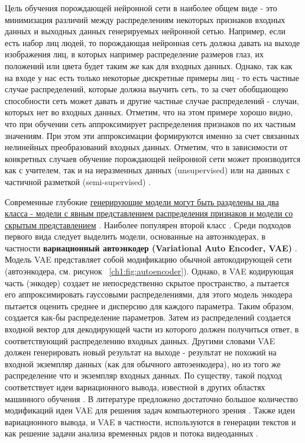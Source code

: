 \documentclass[12pt]{article}
\begin{document}
\begin{sloppypar}
Цель обучения порождающей нейронной сети в наиболее общем виде - это минимизация различий между распределениям некоторых признаков входных данных и выходных данных генерируемых нейронной сетью. Например, если есть набор лиц людей, то порождающая нейронная сеть должна давать на выходе изображения лиц, в которых например распределение размеров глаз, их положений или цвета будет таким же как для входных данных. Однако, так как на входе у нас есть только некоторые дискретные примеры лиц - то есть частные случае распределений, которые должна выучить сеть, то за счет обобщающею способности сеть может давать и другие частные случае распределений - случаи, которых нет во входных данных. Отметим, что на этом примере хорошо видно, что при обучении сеть аппроксимирует распределения признаков по их частным значениям. При этом эти аппроксимации формируются именно за счет связанных нелинейных преобразований входных данных. 
Отметим, что в зависимости от конкретных случаев обучение порождающей нейронной сети может производится как с учителем, так и на неразменных данных (unsupervised) или на данных с частичной разметкой (semi-supervised) \cite{Nikolenko2017DL}.

Современные глубокие \uline{генерирующие модели могут быть разделены на два класса - модели с явным представлением распределения признаков и модели со скрытым представлением} \cite{goodfellow2016nips}. Наиболее популярен второй класс \cite{Nikolenko2017DL}. Среди подходов первого вида следует выделить модели, основанные на автоэнкодерах, в частности \textbf{вариационный автоэнкодер (Variational Auto Encoder, VAE)} \cite{kingma2013auto}. Модель VAE представляет собой модификацию обычной автокодирующей сети (автоэнкодера, см. рисунок ~\ref{ch1:fig:autoencoder}). Однако, в VAE кодирующая часть (энкодер) создает не непосредственно скрытое пространство, а пытается его аппроксимировать  гауссовыми распределениями, для этого модель энкодера пытается оценить среднее и дисперсию для каждого параметра. Таким образом, создается как-бы распределение параметров. Затем из распределений создается входной вектор для декодирующей части из которого должен получиться ответ, в соответствующий распределению входных данных. Другими словами VAE должен генерировать новый результат на выходе - результат не похожий на входной экземпляр данных (как для обычного автоэенкодера), но из того же распределение что и экземпляр входных данных. По существу, такой подход соответствует идеи вариационного вывода, известной в других областях машинного обучения \cite{ghojogh2021factor}. В литературе предложено достаточно большое количество модификаций идеи VAE для решения задач компьютерного зрения \cite{asperti2021survey, harshvardhan2020comprehensive}. Также идеи вариационного вывода, и VAE в частности, используются в генерации текстов \cite{wang2019t} и как решение задачи анализа временных рядов \cite{fortuin2020gp} и потока видеоданных \cite{walker2016uncertain}. 


\end{sloppypar}
\end{document}
